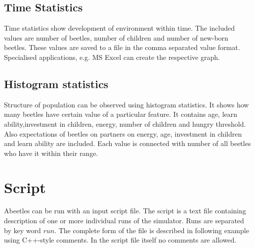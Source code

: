 \documentclass[a4paper,12pt]{report}
\begin{document}
\subsection{Time Statistics}
Time statistics show development of environment within time. The included values are number of beetles, number of children and number of new-born beetles.
These values are saved to a file in the comma separated value format. Specialised applications, e.g. MS Excel can create the respective graph. 
\subsection {Histogram statistics}
Structure of population can be observed using histogram statistics. It shows how many beetles have certain value of a particular feature. It contains age, learn ability,investment in children, energy, number of children and hungry threshold. Also expectations of beetles on partners on energy, age, investment in children and learn ability are included. Each value is connected with number of all beetles who have it within their range. 

\section{Script}

Abeetles can be run with an input script file. The script is a text file containing description of one or more individual runs of the simulator. Runs are separated by key word $run$. The complete form of the file is described in following example using C++-style comments. In the script file itself no comments are allowed.

\end{document}
